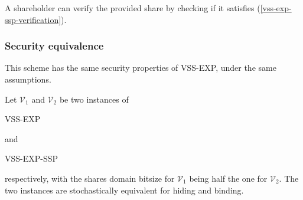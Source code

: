 \documentclass[10pt,journal,cspaper,compsoc]{IEEEtran}
\begin{document}
A shareholder can verify the provided share by checking if it satisfies (\ref{vss-exp-ssp-verification}).\\

\subsubsection{Security equivalence}
This scheme has the same security properties of VSS-EXP, under the same assumptions.

\begin{thm}
Let $\mathcal{V}_1$ and $\mathcal{V}_2$ be two
instances of \begin{small}VSS-EXP\end{small} and
\begin{small}VSS-EXP-SSP\end{small}
respectively, with the shares domain bitsize
for $\mathcal{V}_1$ being half the one for
$\mathcal{V}_2$.
The two instances are stochastically equivalent
for hiding and binding.
\end{thm}
\end{document}
